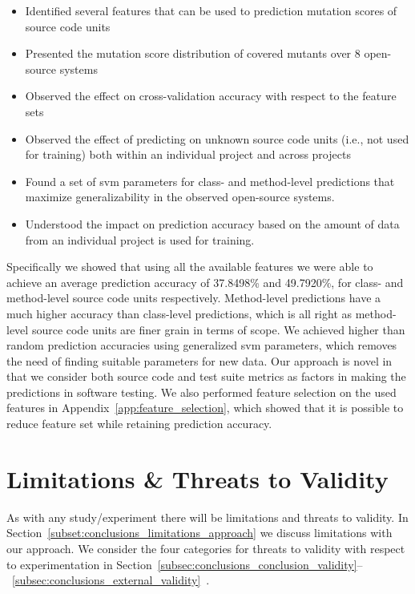 \begin{itemize}
	\item Identified several features that can be used to prediction mutation scores of source code units
	\item Presented the mutation score distribution of covered mutants over 8 open-source systems
	\item Observed the effect on cross-validation accuracy with respect to the feature sets
	\item Observed the effect of predicting on unknown source code units (i.e., not used for training) both within an individual project and across projects
	\item Found a set of \gls{svm} parameters for class- and method-level predictions that maximize generalizability in the observed open-source systems.
	\item Understood the impact on prediction accuracy based on the amount of data from an individual project is used for training.
\end{itemize}

Specifically we showed that using all the available features we were able to achieve an average prediction accuracy of 37.8498\% and 49.7920\%, for class- and method-level source code units respectively. Method-level predictions have a much higher accuracy than class-level predictions, which is all right as method-level source code units are finer grain in terms of scope. We achieved higher than random prediction accuracies using generalized \gls{svm} parameters, which removes the need of finding suitable parameters for new data. Our approach is novel in that we consider both source code and test suite metrics as factors in making the predictions in software testing. We also performed feature selection on the used features in Appendix~\ref{app:feature_selection}, which showed that it is possible to reduce feature set while retaining prediction accuracy.


\section{Limitations \& Threats to Validity}
\label{sec:conclusions_limitations}
As with any study/experiment there will be limitations and threats to validity. In Section~\ref{subset:conclusions_limitations_approach} we discuss limitations with our approach. We consider the four categories for threats to validity with respect to experimentation in Section~\ref{subsec:conclusions_conclusion_validity}--~\ref{subsec:conclusions_external_validity}~\cite{WRH+00,WKP10}.



